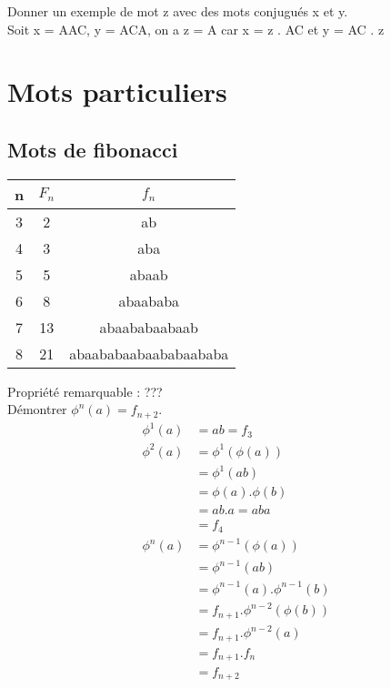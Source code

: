 \documentclass[11pt,a4paper]{article}
\begin{document}
	Donner un exemple de mot z avec des mots conjugués x et y.\\
	Soit x = AAC, y = ACA, on a z = A car x = z . AC et y = AC . z
	
	\section{Mots particuliers}
	
	\subsection{Mots de fibonacci}
	
	\begin{center}
		\begin{tabular}{|c|c|c|}
			\hline
			n & $F_n$ & $f_n$\\ 
			\hline 
			3 & 2 & ab \\ 
			\hline 
			4 & 3 & aba \\ 
			\hline 
			5 & 5 & abaab \\ 
			\hline 
			6 & 8 & abaababa \\ 
			\hline 
			7 & 13 & abaababaabaab \\ 
			\hline 
			8 & 21 & abaababaabaababaababa \\ 
			\hline 
		\end{tabular} 
	\end{center}

	Propriété remarquable : ???\\
	
	Démontrer $\phi^{n}(a) = f_{n+2}$.
	\begin{align*}
		\phi^{1}(a) &= ab = f_{3}\\
		\phi^{2}(a) &= \phi^{1}(\phi(a))\\
		&= \phi^{1}(ab)\\
		&= \phi(a) . \phi(b)\\
		&= ab . a = aba\\
		&= f_{4}\\
		\phi^{n}(a) &= \phi^{n-1}(\phi(a))\\
		&= \phi^{n-1}(ab)\\
		&= \phi^{n-1}(a) . \phi^{n-1}(b)\\
		&= f_{n+1} . \phi^{n-2}(\phi(b))\\
		&= f_{n+1} . \phi^{n-2}(a)\\
		&= f_{n+1} . f_{n}\\
		&= f_{n+2}\\
	\end{align*}
	
\end{document}
